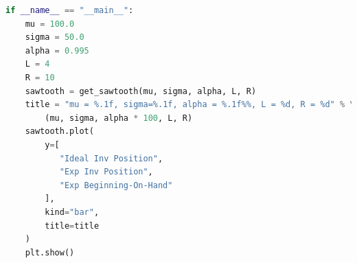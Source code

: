 \documentclass[11pt]{amsart}
\begin{document}
\begin{appendices}
\begin{lstlisting}[language=Python]
if __name__ == "__main__":
    mu = 100.0
    sigma = 50.0
    alpha = 0.995
    L = 4
    R = 10
    sawtooth = get_sawtooth(mu, sigma, alpha, L, R)
    title = "mu = %.1f, sigma=%.1f, alpha = %.1f%%, L = %d, R = %d" % \
        (mu, sigma, alpha * 100, L, R)
    sawtooth.plot(
        y=[
           "Ideal Inv Position",
           "Exp Inv Position",
           "Exp Beginning-On-Hand"
        ],
        kind="bar",
        title=title
    )
    plt.show()
    
\end{lstlisting}

\end{appendices}
\end{document}
